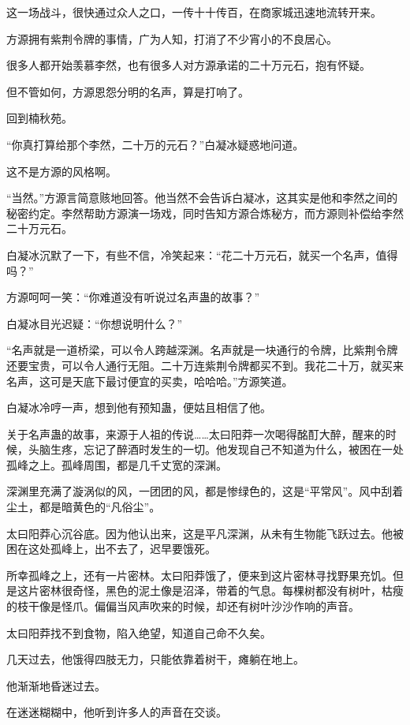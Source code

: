 \begin{this_body}
这一场战斗，很快通过众人之口，一传十十传百，在商家城迅速地流转开来。

方源拥有紫荆令牌的事情，广为人知，打消了不少宵小的不良居心。

很多人都开始羡慕李然，也有很多人对方源承诺的二十万元石，抱有怀疑。

但不管如何，方源恩怨分明的名声，算是打响了。

回到楠秋苑。

“你真打算给那个李然，二十万的元石？”白凝冰疑惑地问道。

这不是方源的风格啊。

“当然。”方源言简意赅地回答。他当然不会告诉白凝冰，这其实是他和李然之间的秘密约定。李然帮助方源演一场戏，同时告知方源合炼秘方，而方源则补偿给李然二十万元石。

白凝冰沉默了一下，有些不信，冷笑起来：“花二十万元石，就买一个名声，值得吗？”

方源呵呵一笑：“你难道没有听说过名声蛊的故事？”

白凝冰目光迟疑：“你想说明什么？”

“名声就是一道桥梁，可以令人跨越深渊。名声就是一块通行的令牌，比紫荆令牌还要宝贵，可以令人通行无阻。二十万连紫荆令牌都买不到。我花二十万，就买来名声，这可是天底下最讨便宜的买卖，哈哈哈。”方源笑道。

白凝冰冷哼一声，想到他有预知蛊，便姑且相信了他。

关于名声蛊的故事，来源于人祖的传说……太曰阳莽一次喝得酩酊大醉，醒来的时候，头脑生疼，忘记了醉酒时发生的一切。他发现自己不知道为什么，被困在一处孤峰之上。孤峰周围，都是几千丈宽的深渊。

深渊里充满了漩涡似的风，一团团的风，都是惨绿色的，这是“平常风”。风中刮着尘土，都是暗黄色的“凡俗尘”。

太曰阳莽心沉谷底。因为他认出来，这是平凡深渊，从未有生物能飞跃过去。他被困在这处孤峰上，出不去了，迟早要饿死。

所幸孤峰之上，还有一片密林。太曰阳莽饿了，便来到这片密林寻找野果充饥。但是这片密林很奇怪，黑色的泥土像是沼泽，带着的气息。每棵树都没有树叶，枯瘦的枝干像是怪爪。偏偏当风声吹来的时候，却还有树叶沙沙作响的声音。

太曰阳莽找不到食物，陷入绝望，知道自己命不久矣。

几天过去，他饿得四肢无力，只能依靠着树干，瘫躺在地上。

他渐渐地昏迷过去。

在迷迷糊糊中，他听到许多人的声音在交谈。


\end{this_body}
